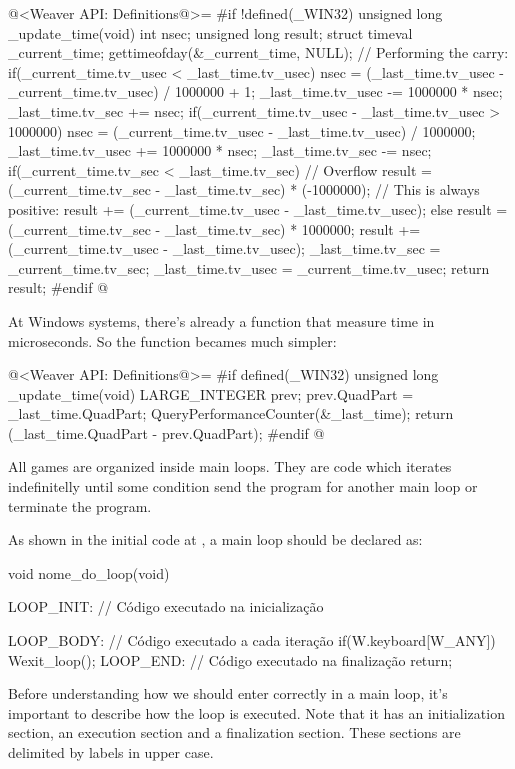 \iniciocodigo
@<Weaver API: Definitions@>=
#if !defined(_WIN32)
unsigned long _update_time(void){
  int nsec;
  unsigned long result;
  struct timeval _current_time;
  gettimeofday(&_current_time, NULL);
  // Performing the carry:
  if(_current_time.tv_usec < _last_time.tv_usec){
    nsec = (_last_time.tv_usec - _current_time.tv_usec) / 1000000 + 1;
    _last_time.tv_usec -= 1000000 * nsec;
    _last_time.tv_sec += nsec;
  }
  if(_current_time.tv_usec - _last_time.tv_usec > 1000000){
    nsec = (_current_time.tv_usec - _last_time.tv_usec) / 1000000;
    _last_time.tv_usec += 1000000 * nsec;
    _last_time.tv_sec -= nsec;
  }
  if(_current_time.tv_sec < _last_time.tv_sec){
    // Overflow
    result = (_current_time.tv_sec - _last_time.tv_sec) * (-1000000);
    // This is always positive:
    result += (_current_time.tv_usec - _last_time.tv_usec);
  }
  else{
    result = (_current_time.tv_sec - _last_time.tv_sec) * 1000000;
    result += (_current_time.tv_usec - _last_time.tv_usec);
  }
  _last_time.tv_sec = _current_time.tv_sec;
  _last_time.tv_usec = _current_time.tv_usec;
  return result;
}
#endif
@
\fimcodigo

At Windows systems, there's already a function that measure time in
microseconds. So the function becames much simpler:

\iniciocodigo
@<Weaver API: Definitions@>=
#if defined(_WIN32)
unsigned long _update_time(void){
  LARGE_INTEGER prev;
  prev.QuadPart = _last_time.QuadPart;
  QueryPerformanceCounter(&_last_time);
  return (_last_time.QuadPart - prev.QuadPart);
}
#endif
@
\fimcodigo


All games are organized inside main loops. They are code which
iterates indefinitelly until some condition send the program for
another main loop or terminate the program.

As shown in the initial code at , a main loop
should be declared as:

\alinhaverbatim
void nome\_do\_loop(void){
 LOOP\_INIT: // Código executado na inicialização

 LOOP\_BODY: // Código executado a cada iteração
    if(W.keyboard[W\_ANY])
        Wexit\_loop();
 LOOP\_END: // Código executado na finalização
    return;
}
\alinhanormal

Before understanding how we should enter correctly in a main loop,
it's important to describe how the loop is executed. Note that it has
an initialization section, an execution section and a finalization
section. These sections are delimited by labels in upper case.

